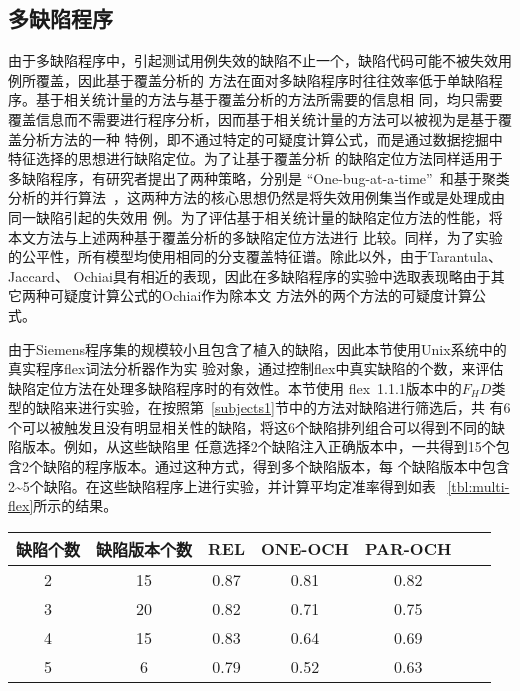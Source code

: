 \subsection{多缺陷程序}
由于多缺陷程序中，引起测试用例失效的缺陷不止一个，缺陷代码可能不被失效用例所覆盖，因此基于覆盖分析的
方法在面对多缺陷程序时往往效率低于单缺陷程序。基于相关统计量的方法与基于覆盖分析的方法所需要的信息相
同，均只需要覆盖信息而不需要进行程序分析，因而基于相关统计量的方法可以被视为是基于覆盖分析方法的一种
特例，即不通过特定的可疑度计算公式，而是通过数据挖掘中特征选择的思想进行缺陷定位。为了让基于覆盖分析
的缺陷定位方法同样适用于多缺陷程序，有研究者提出了两种策略，分别是
``One-bug-at-a-time''~\cite{klahr1988cognitive}和基于聚类分析的并行算法~\cite{jones2007debugging,
zheng2006statistical}，这两种方法的核心思想仍然是将失效用例集当作或是处理成由同一缺陷引起的失效用
例。为了评估基于相关统计量的缺陷定位方法的性能，将本文方法与上述两种基于覆盖分析的多缺陷定位方法进行
比较。同样，为了实验的公平性，所有模型均使用相同的分支覆盖特征谱。除此以外，由于Tarantula、Jaccard、
Ochiai具有相近的表现，因此在多缺陷程序的实验中选取表现略由于其它两种可疑度计算公式的Ochiai作为除本文
方法外的两个方法的可疑度计算公式。

由于Siemens程序集的规模较小且包含了植入的缺陷，因此本节使用Unix系统中的真实程序flex词法分析器作为实
验对象，通过控制flex中真实缺陷的个数，来评估缺陷定位方法在处理多缺陷程序时的有效性。本节使用
flex~1.1.1版本中的$F_HD$类型的缺陷来进行实验，在按照第~\ref{subjects1}节中的方法对缺陷进行筛选后，共
有6个可以被触发且没有明显相关性的缺陷，将这6个缺陷排列组合可以得到不同的缺陷版本。例如，从这些缺陷里
任意选择2个缺陷注入正确版本中，一共得到15个包含2个缺陷的程序版本。通过这种方式，得到多个缺陷版本，每
个缺陷版本中包含2\textasciitilde5个缺陷。在这些缺陷程序上进行实验，并计算平均定准率得到如表
~\ref{tbl:multi-flex}所示的结果。

\begin{center}
\label{tbl:multi-flex}
\begin{tabular}{ccccccc}
\toprule
缺陷个数 & 缺陷版本个数 & REL & ONE-OCH & PAR-OCH \\ \hline
2 & 15 & 0.87 & 0.81 & 0.82  \\ \hline
3 & 20 & 0.82 & 0.71 & 0.75  \\ \hline
4 & 15 & 0.83 & 0.64 & 0.69  \\ \hline
5 & 6 & 0.79 & 0.52 & 0.63  \\ 
\bottomrule
\end{tabular}
\end{center}

